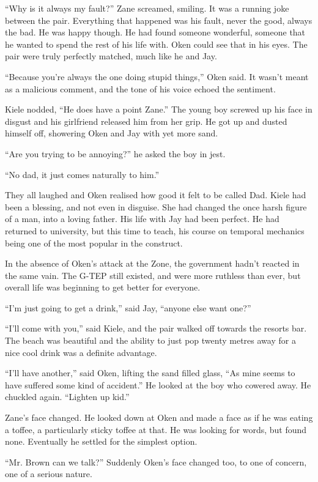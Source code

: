 ``Why is it always my fault?'' Zane screamed, smiling.  It was a running joke between the pair.  Everything that happened was his fault, never the good, always the bad.  He was happy though.  He had found someone wonderful, someone that he wanted to spend the rest of his life with.  Oken could see that in his eyes.  The pair were truly perfectly matched, much like he and Jay.  

``Because you're always the one doing stupid things,'' Oken said.  It wasn't meant as a malicious comment, and the tone of his voice echoed the sentiment.

Kiele nodded, ``He does have a point Zane.''  The young boy screwed up his face in disgust and his girlfriend released him from her grip.  He got up and dusted himself off, showering Oken and Jay with yet more sand.

``Are you trying to be annoying?'' he asked the boy in jest.

``No dad, it just comes naturally to him.''

They all laughed and Oken realised how good it felt to be called Dad.  Kiele had been a blessing, and not even in disguise.  She had changed the once harsh figure of a man, into a loving father.  His life with Jay had been perfect.  He had returned to university, but this time to teach, his course on temporal mechanics being one of the most popular in the construct.

In the absence of Oken's attack at the Zone, the government hadn't reacted in the same vain.  The G-TEP still existed, and were more ruthless than ever, but overall life was beginning to get better for everyone.

``I'm just going to get a drink,'' said Jay, ``anyone else want one?''

``I'll come with you,'' said Kiele, and the pair walked off towards the resorts bar.  The beach was beautiful and the ability to just pop twenty metres away for a nice cool drink was a definite advantage.

``I'll have another,'' said Oken, lifting the sand filled glass, ``As mine seems to have suffered some kind of accident.''  He looked at the boy who cowered away.  He chuckled again.  ``Lighten up kid.''  

Zane's face changed.  He looked down at Oken and made a face as if he was eating a toffee, a particularly sticky toffee at that.  He was looking for words, but found none.  Eventually he settled for the simplest option.

``Mr. Brown can we talk?''  Suddenly Oken's face changed too, to one of concern, one of a serious nature.


